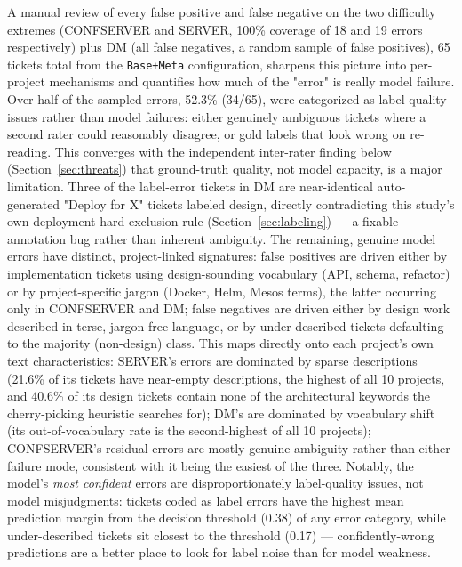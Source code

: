 \documentclass[preprint,12pt]{elsarticle}
\begin{document}
A manual review of every false positive and false negative on the two difficulty extremes (CONFSERVER and SERVER, 100\% coverage of 18 and 19 errors respectively) plus DM (all false negatives, a random sample of false positives), 65 tickets total from the \texttt{Base+Meta} configuration, sharpens this picture into per-project mechanisms and quantifies how much of the "error" is really model failure. Over half of the sampled errors, 52.3\% (34/65), were categorized as label-quality issues rather than model failures: either genuinely ambiguous tickets where a second rater could reasonably disagree, or gold labels that look wrong on re-reading. This converges with the independent inter-rater finding below (Section~\ref{sec:threats}) that ground-truth quality, not model capacity, is a major limitation. Three of the label-error tickets in DM are near-identical auto-generated "Deploy for X" tickets labeled design, directly contradicting this study's own deployment hard-exclusion rule (Section~\ref{sec:labeling}) — a fixable annotation bug rather than inherent ambiguity. The remaining, genuine model errors have distinct, project-linked signatures: false positives are driven either by implementation tickets using design-sounding vocabulary (API, schema, refactor) or by project-specific jargon (Docker, Helm, Mesos terms), the latter occurring only in CONFSERVER and DM; false negatives are driven either by design work described in terse, jargon-free language, or by under-described tickets defaulting to the majority (non-design) class. This maps directly onto each project's own text characteristics: SERVER's errors are dominated by sparse descriptions (21.6\% of its tickets have near-empty descriptions, the highest of all 10 projects, and 40.6\% of its design tickets contain none of the architectural keywords the cherry-picking heuristic searches for); DM's are dominated by vocabulary shift (its out-of-vocabulary rate is the second-highest of all 10 projects); CONFSERVER's residual errors are mostly genuine ambiguity rather than either failure mode, consistent with it being the easiest of the three. Notably, the model's \emph{most confident} errors are disproportionately label-quality issues, not model misjudgments: tickets coded as label errors have the highest mean prediction margin from the decision threshold (0.38) of any error category, while under-described tickets sit closest to the threshold (0.17) — confidently-wrong predictions are a better place to look for label noise than for model weakness.
\end{document}
